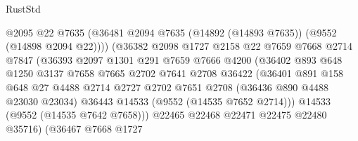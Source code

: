 \begin{lexlean}{RustStd}
\begin{coremodule}
                                @2095
                                @22
                                @7635
                                (@36481
                                  @2094
                                  @7635
                                  (@14892 (@14893 @7635))
                                  (@9552 (@14898 @2094 @22))))
                              (@36382
                                @2098
                                @1727
                                @2158
                                @22
                                @7659
                                @7668
                                @2714
                                @7847
                                (@36393
                                  @2097
                                  @1301
                                  @291
                                  @7659
                                  @7666
                                  @4200
                                  (@36402
                                    @893
                                    @648
                                    @1250
                                    @3137
                                    @7658
                                    @7665
                                    @2702
                                    @7641
                                    @2708
                                    @36422
                                    (@36401
                                      @891
                                      @158
                                      @648
                                      @27
                                      @4488
                                      @2714
                                      @2727
                                      @2702
                                      @7651
                                      @2708
                                      (@36436 @890 @4488 @23030 @23034)
                                      @36443
                                      @14533
                                      (@9552 (@14535 @7652 @2714)))
                                    @14533
                                    (@9552 (@14535 @7642 @7658)))
                                  @22465
                                  @22468
                                  @22471
                                  @22475
                                  @22480
                                  @35716)
                                (@36467
                                  @7668
                                  @1727

\end{coremodule}
\end{lexlean}
